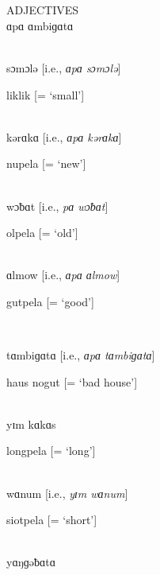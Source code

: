 \\

\\

\noindent ADJECTIVES\\

\noindent ɑpɑ ɑmbiɡɑtɑ


\\

\noindent {\textasciitilde} sɔmɔlə [i.e., \textit{ɑpɑ sɔmɔlə}]

\noindent liklik [= ‘small’]

\\

\noindent {\textasciitilde} kərɑkɑ [i.e., \textit{ɑpɑ kərɑkɑ}]

\noindent nupela [= ‘new’]

\\

\noindent {\textasciitilde} wɔƀɑt [i.e., \textit{pɑ wɔƀɑt}]

\noindent olpela [= ‘old’]

\\

\noindent {\textasciitilde} ɑlmow [i.e., \textit{ɑpɑ ɑlmow}]

\noindent gutpela [= ‘good’]

\\

\newpage

\noindent {\textasciitilde} tɑmbiɡɑtɑ [i.e., \textit{ɑpɑ tɑmbiɡɑtɑ}]

\noindent haus nogut [= ‘bad house’]

\\

\noindent yɪm kɑkɑs

\noindent longpela [= ‘long’]

\\

\noindent {\textasciitilde} wɑnum [i.e., \textit{yɪm wɑnum}]

\noindent siotpela [= ‘short’]

\\

\noindent yɑŋɡəƀɑtɑ

